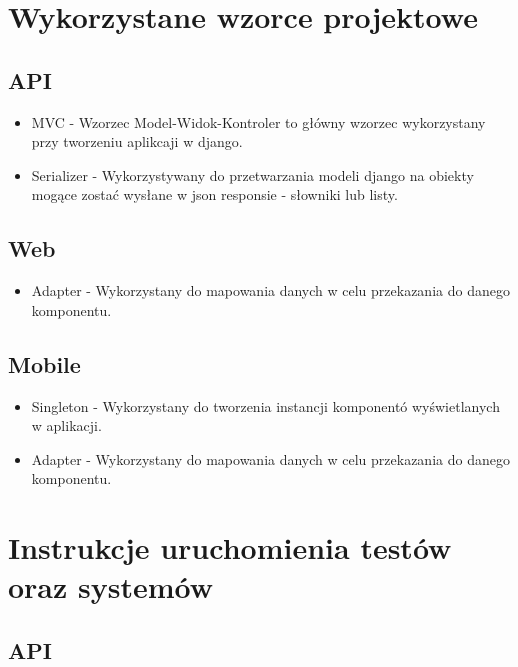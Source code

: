 \documentclass{article}
\begin{document}
\section{Wykorzystane wzorce projektowe}
\subsection{API}
\begin{itemize}
    \item MVC - Wzorzec Model-Widok-Kontroler to główny wzorzec wykorzystany przy tworzeniu aplikcaji w django.
    \item Serializer - Wykorzystywany do przetwarzania modeli django na obiekty mogące zostać wysłane w json responsie - słowniki lub listy.
\end{itemize}
\subsection{Web}
\begin{itemize}
    \item Adapter - Wykorzystany do mapowania danych w celu przekazania do danego komponentu.
\end{itemize}
\subsection{Mobile}
\begin{itemize}
    \item Singleton - Wykorzystany do tworzenia instancji komponentó wyświetlanych w aplikacji.
    \item Adapter - Wykorzystany do mapowania danych w celu przekazania do danego komponentu.
\end{itemize}

\section{Instrukcje uruchomienia testów oraz systemów}
\subsection{API}
\end{document}
